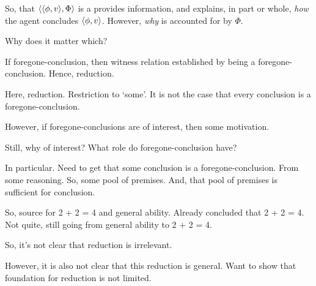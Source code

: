 \begin{note}
  So, that \(\langle \langle \phi, v \rangle, \Phi \rangle\) is a  provides information, and explains, in part or whole, \emph{how} the agent concludes \(\langle \phi, v \rangle\).
  However, \emph{why} is accounted for by \(\Phi\).
\end{note}

\begin{note}
  Why does it matter which?

  \begin{idea}[Reduction]
    If foregone-conclusion, then witness relation established by being a foregone-conclusion.
    Hence, reduction.
  \end{idea}
  Here, reduction.
  Restriction to `some'.
  It is not the case that every conclusion is a foregone-conclusion.

  However, if foregone-conclusions are of interest, then some motivation.

  Still, why of interest?
  What role do foregone-conclusion have?

  In particular.
  Need to get that some conclusion is a foregone-conclusion.
  From some reasoning.
  So, some pool of premises.
  And, that pool of premises is sufficient for conclusion.

  So, source for 2 + 2 = 4 and general ability.
  Already concluded that 2 + 2 = 4.
  Not quite, still going from general ability to 2 + 2 = 4.

  So, it's not clear that reduction is irrelevant.

  However, it is also not clear that this reduction is general.
  Want to show that foundation for reduction is not limited.
\end{note}

